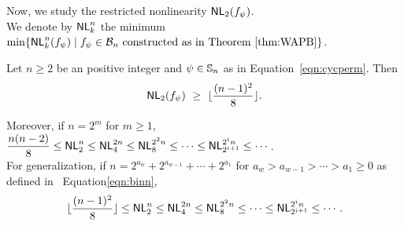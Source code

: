 \documentclass{llncs}
\begin{document}
\noindent Now, we study the restricted nonlinearity $\mathsf{NL}_{2}(f_\psi)$.\\
We denote by $\mathsf{NL}_{k}^n$ the minimum $\min\{\mathsf{NL}_{k}^n(f_\psi) \mid f_\psi \in \mathcal{B}_n  \text{ constructed as in Theorem~\ref{thm:WAPB}}\}$.
\begin{theorem}
Let $n \geq 2$ be an positive integer and $\psi \in \mathbb{S}_n$ as in Equation~\ref{eqn:cycperm}.
Then $$\mathsf{NL}_{2}(f_\psi) ~\geq ~ \lfloor\frac{(n-1)^2}{8}\rfloor .$$
\iffalse
$$\NLk{2}(f_\psi) ~\geq ~ \left\{
\begin{array}{lr}
	\frac{n(n-2)}{8} & \text{ if } n \text{ is even}\\
	\lfloor\frac{(n-1)^2}{8}\rfloor & \text{ if } n \text{ is odd}.   
\end{array} \right.$$\fi
Moreover, if $n = 2^m$ for $m \geq 1$, ~~~~$\dfrac{n(n-2)}{8} \leq \mathsf{NL}_{2}^n \leq \mathsf{NL}_{4}^{2n} \leq \mathsf{NL}_{8}^{2^{2}n } \leq \cdots \leq \mathsf{NL}_{2^{i+1}}^{2^{i}n} \leq \cdots $.\\
For generalization, if $n =  2^{a_w} + 2^{a_{w-1}} + \cdots + 2^{a_1}$ for $ a_w > a_{w-1} > \cdots > a_1 \geq 0$ as defined in ~Equation\ref{eqn:binn},
$$\lfloor\frac{(n-1)^2}{8}\rfloor \leq \mathsf{NL}_{2}^n \leq \mathsf{NL}_{4}^{2n} \leq \mathsf{NL}_{8}^{2^{2}n } \leq \cdots \leq \mathsf{NL}_{2^{i+1}}^{2^{i}n} \leq \cdots.$$
\end{theorem}
\end{document}
